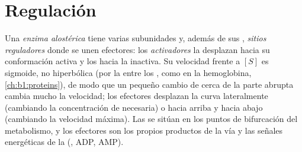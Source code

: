 \section{Regulación}

\begin{definition}\label{def:b1:enzymes:allosteric}
Una \emph{enzima alostérica} tiene varias
subunidades y, además de sus , \emph{sitios reguladores}
donde se unen efectores: los \emph{activadores} la desplazan hacia su
conformación activa y los \emph{} hacia la inactiva. Su velocidad
frente a $[S]$ es sigmoide, no hiperbólica (por la  entre los
, como en la hemoglobina, \cref{ch:b1:proteins}), de modo que
un pequeño cambio de  cerca de la parte abrupta cambia mucho la
velocidad; los efectores desplazan la curva lateralmente (cambiando la
concentración de  necesaria) o hacia arriba y hacia abajo
(cambiando la velocidad máxima). Las   se sitúan en los
puntos de bifurcación del metabolismo, y los efectores son los propios
productos de la vía y las señales energéticas de la  (, ADP, AMP).
\end{definition}

